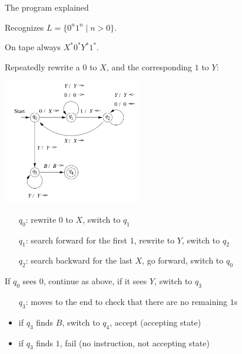\documentclass[handout]{beamer}
\begin{document}
\begin{frame}{The program explained}

    \vspace{-6pt}
    \begin{multicols}{2}
        Recognizes \alert{$L=\{0^n1^n\mid n>0\}$}.

        \vspace{12pt}

        On tape always $X^*0^*Y^*1^*$.

        \vspace{12pt}

        Repeatedly rewrite a $0$ to $X$, and the corresponding $1$ to $Y$:

        \begin{center}
            \includegraphics[width=0.45\textwidth]{files/tmTrans.PNG}
        \end{center}

    \end{multicols}   
    
    \vspace{-1.25cm}

    \begin{itemize}
        \item[$q_0$:] rewrite $0$ to $X$, switch to $q_1$
        \item[$q_1$:] search forward for the first $1$, rewrite to $Y$, switch to $q_2$
        \item[$q_2$:] search backward for the last $X$, go forward, switch to $q_0$
    \end{itemize}

    If $q_0$ sees $0$, continue as above, if it sees $Y$, switch to $q_3$    
    \begin{itemize}
        \item[$q_3$:] moves to the end to check that there are no remaining $1$s
        \item if $q_3$ finds $B$, switch to $q_4$, accept (accepting state)
        \item if $q_3$ finds $1$, fail (no instruction, not accepting state) 
    \end{itemize}

\end{frame}
\end{document}
